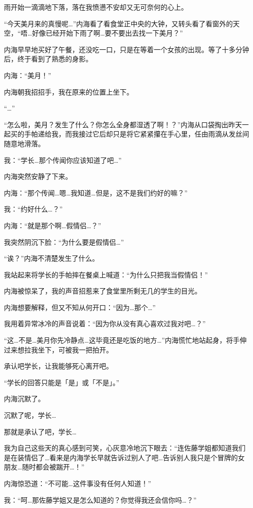 \newday{\rain\rainy}

雨开始一滴滴地下落，落在我愤懑不安却又无可奈何的心上。

\cutlineg\rain

“今天美月来的真慢呢…”内海看了看食堂正中央的大钟，又转头看了看窗外的天空，“唔…好像已经开始下雨了啊…要不要出去找一下美月？”

内海早早地买好了午餐，还没吃一口，只是在等着一个女孩的出现。等了十多分钟后，终于看到了熟悉的身影。

内海：“美月！”

内海朝我招招手，我在原来的位置上坐下。

“…”

“怎么啦，美月？发生了什么？你怎么全身都湿透了啊！？”内海从口袋掏出昨天一起买的手帕递给我，而我接过它后却只是将它紧紧攥在手心里，任由雨滴从发丝间随意地滑落。

我：“学长…那个传闻你应该知道了吧…”

内海突然安静了下来。

内海：“那个传闻…嗯…我知道…但是，这不是我们约好的嘛？”

我：“约好什么…？”

内海：“就是那个啊…假情侣…？”

我突然阴沉下脸：“为什么要是假情侣…”

“诶？”内海不清楚发生了什么。

我站起来将学长的手帕摔在餐桌上喊道：“为什么只把我当假情侣！”

内海被惊呆了，我的声音招惹来了食堂里所剩无几的学生的目光。

内海想要解释，但又不知从何开口：“因为…那个…”

我用着异常冰冷的声音说着：“因为你从没有真心喜欢过我对吧…？”

“这…不是…美月你先冷静点…这毕竟还是吃饭的地方…”内海慌忙地站起身，将手伸过来想拉我坐下，可被我一把拍开。

承认吧学长，让我能够死心离开吧。

“学长的回答只能是「是」或「不是」。”

内海沉默了。

沉默了呢，学长…

那就是承认了吧，学长…

我为自己这些天的真心感到可笑，心灰意冷地沉下眼去：“连佐藤学姐都知道我们是在装情侣了…看来是内海学长早就告诉过别人了吧…告诉别人我只是个冒牌的女朋友…随时都会被踹开…！”

内海惊恐道：“不可能…这件事没有任何人知道！”

我：“呵…那佐藤学姐又是怎么知道的？你觉得我还会信你吗…？”

